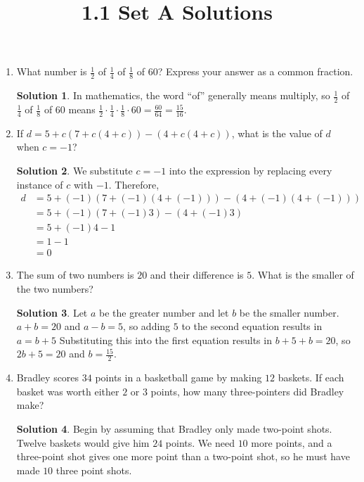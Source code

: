 \documentclass{article}
\title{1.1 Set A Solutions}
\author{}
\date{}
\theoremstyle{definition}
\newtheorem*{solution}{Solution}
\begin{document}
    \maketitle
    \begin{enumerate}
        \item What number is $\frac{1}{2}$ of $\frac{1}{4}$ of $\frac{1}{8}$ of $60$? Express your answer as a common fraction.
        \begin{solution}
            In mathematics, the word ``of'' generally means multiply, so $\frac{1}{2}$ of $\frac{1}{4}$ of $\frac{1}{8}$ of $60$ means $\frac{1}{2} \cdot \frac{1}{4} \cdot \frac{1}{8} \cdot 60 = \frac{60}{64} = \frac{15}{16}$.
        \end{solution}
        \item If $d = 5 + c(7 + c(4 + c)) - (4 + c(4 + c))$, what is the value of $d$ when $c = -1$?
        \begin{solution}
            We substitute $c = -1$ into the expression by replacing every instance of $c$ with $-1$. Therefore,
            \[\begin{split}
                d & = 5 + (-1)(7 + (-1)(4 + (-1))) - (4 + (-1)(4 + (-1))) \\
                & = 5 + (-1)(7 + (-1)3) - (4 + (-1)3) \\
                & = 5 + (-1)4 - 1 \\
                & = 1 - 1 \\
                & = 0
            \end{split}\]
        \end{solution}
        \item The sum of two numbers is $20$ and their difference is $5$. What is the smaller of the two numbers?
        \begin{solution}
            Let $a$ be the greater number and let $b$ be the smaller number. $a + b = 20$ and $a - b = 5$, so adding $5$ to the second equation results in $a = b + 5$ Substituting this into the first equation results in $b + 5 + b = 20$, so $2b + 5 = 20$ and $b = \frac{15}{2}$.
        \end{solution}
        \item Bradley scores $34$ points in a basketball game by making $12$ baskets. If each basket was worth either $2$ or $3$ points, how many three-pointers did Bradley make?
        \begin{solution}
            Begin by assuming that Bradley only made two-point shots. Twelve baskets would give him $24$ points. We need $10$ more points, and a three-point shot gives one more point than a two-point shot, so he must have made $10$ three point shots.


\end{solution}
\end{enumerate}
\end{document}
